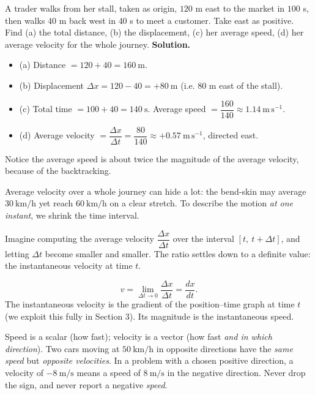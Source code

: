\documentclass[11pt]{article}
\newcommand{\cle}[1]{{\popxbold\color{popdark}#1}}
\newcounter{popsec}
\newcounter{popsub}
\newcommand{\courssub}[1]{%
  \stepcounter{popsub}%
  \par\vspace{9pt}\noindent{\popxbold\fontsize{11.5}{13}\selectfont\color{popink}{\color{poporange}\thepopsec.\thepopsub}\hspace{6pt}#1}\par\nopagebreak\vspace{4pt}
}
\begin{document}
\begin{exoresolu}
A trader walks from her stall, taken as origin, $120$ m east to the market in $100$ s, then walks $40$ m back west in $40$ s to meet a customer. Take east as positive. Find (a) the total distance, (b) the displacement, (c) her average speed, (d) her average velocity for the whole journey.
\tcblower
\textbf{Solution.}
\begin{itemize}
\item (a) Distance $= 120 + 40 = 160\ \mathrm{m}$.
\item (b) Displacement $\Delta x = 120 - 40 = +80\ \mathrm{m}$ (i.e. $80$ m east of the stall).
\item (c) Total time $= 100 + 40 = 140\ \mathrm{s}$. Average speed $= \dfrac{160}{140} \approx 1.14\ \mathrm{m\,s^{-1}}$.
\item (d) Average velocity $= \dfrac{\Delta x}{\Delta t} = \dfrac{80}{140} \approx +0.57\ \mathrm{m\,s^{-1}}$, directed east.
\end{itemize}
Notice the average speed is about twice the magnitude of the average velocity, because of the backtracking.
\end{exoresolu}

\courssub{Instantaneous Velocity}

Average velocity over a whole journey can hide a lot: the bend-skin may average $30\ \mathrm{km/h}$ yet reach $60\ \mathrm{km/h}$ on a clear stretch. To describe the motion \emph{at one instant}, we shrink the time interval.

Imagine computing the average velocity $\dfrac{\Delta x}{\Delta t}$ over the interval $[t,\ t+\Delta t]$, and letting $\Delta t$ become smaller and smaller. The ratio settles down to a definite value: the \cle{instantaneous velocity} at time $t$.

\begin{definition}
\[
v = \lim_{\Delta t \to 0} \frac{\Delta x}{\Delta t} = \frac{dx}{dt}.
\]
The instantaneous velocity is the gradient of the position--time graph at time $t$ (we exploit this fully in Section 3). Its magnitude is the instantaneous \cle{speed}.
\end{definition}

\begin{attention}
Speed is a scalar (how fast); velocity is a vector (how fast \emph{and in which direction}). Two cars moving at $50\ \mathrm{km/h}$ in opposite directions have the \emph{same speed} but \emph{opposite velocities}. In a problem with a chosen positive direction, a velocity of $-8\ \mathrm{m/s}$ means a speed of $8\ \mathrm{m/s}$ in the negative direction. Never drop the sign, and never report a negative \emph{speed}.
\end{attention}
\end{document}
